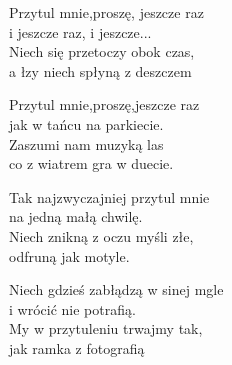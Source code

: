 \begin{text}
    Przytul mnie,proszę, jeszcze raz\\
    i jeszcze raz, i jeszcze...\\
    Niech się przetoczy obok czas,\\
    a łzy niech spłyną z deszczem

    Przytul mnie,proszę,jeszcze raz\\
    jak w tańcu na parkiecie.\\
    Zaszumi nam muzyką las\\
    co z wiatrem gra w duecie.

    Tak najzwyczajniej przytul mnie\\
    na jedną małą chwilę.\\
    Niech znikną z oczu myśli złe,\\
    odfruną jak motyle.

    Niech gdzieś zabłądzą w sinej mgle\\
    i wrócić nie potrafią.\\
    My w przytuleniu trwajmy tak,\\
    jak ramka z fotografią
\end{text}
\begin{chord}
\end{chord}